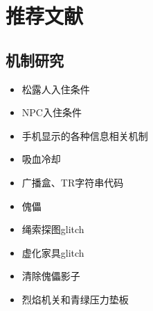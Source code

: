 \chapter{推荐文献}

\section{机制研究}
\begin{maybecols}
\begin{itemize}
\item {} 松露人入住条件 
\item {} NPC入住条件 
\item {} 手机显示的各种信息相关机制 
\item {} 吸血冷却 
\item {} 广播盒、TR字符串代码 
\item {} 傀儡  
\item {} 绳索探图glitch 
\item {} 虚化家具glitch 
\item {} 清除傀儡影子 
\item {} 烈焰机关和青绿压力垫板 
\end{itemize}
\end{maybecols}

